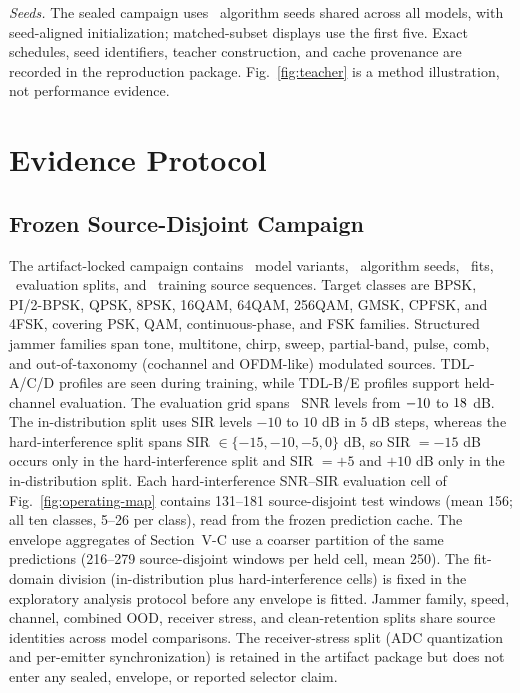 \documentclass[letterpaper,journal]{IEEEtran}
\begin{document}
\emph{Seeds.} The sealed campaign uses \ProtocolSeedCount\ algorithm seeds
shared across all models, with seed-aligned initialization; matched-subset
displays use the first five. Exact schedules, seed identifiers, teacher construction,
and cache provenance are recorded in the reproduction package.
Fig.~\ref{fig:teacher} is a method illustration, not performance evidence.

\section{Evidence Protocol}
\subsection{Frozen Source-Disjoint Campaign}
The artifact-locked campaign contains \ProtocolModelCount\ model variants,
\ProtocolSeedCount\ algorithm seeds, \ProtocolFitCount\ fits,
\ProtocolSplitCount\ evaluation splits, and \ProtocolTrainSources\ training
source sequences. Target classes are BPSK, PI/2-BPSK, QPSK, 8PSK, 16QAM, 64QAM, 256QAM, GMSK,
CPFSK, and 4FSK, covering PSK, QAM, continuous-phase, and FSK families.
Structured jammer families span tone, multitone, chirp, sweep, partial-band,
pulse, comb, and out-of-taxonomy (cochannel and OFDM-like) modulated sources. TDL-A/C/D
profiles are seen during training, while TDL-B/E profiles support held-channel
evaluation. The evaluation grid spans \SnrGridCount\ SNR levels from
$-10$ to $18$ dB. The in-distribution split uses SIR levels
$-10$ to $10$ dB in $5$ dB steps, whereas the hard-interference split spans
SIR $\in\{-15,-10,-5,0\}$ dB, so SIR $=-15$ dB occurs only in the
hard-interference split and SIR $=+5$ and $+10$ dB only in the in-distribution
split. Each hard-interference SNR--SIR evaluation cell of
Fig.~\ref{fig:operating-map} contains 131--181 source-disjoint test windows
(mean 156; all ten classes, 5--26 per class), read from the frozen prediction
cache. The envelope aggregates of Section~V-C use a coarser partition of the
same predictions (216--279 source-disjoint windows per held cell, mean 250). The fit-domain division
(in-distribution plus hard-interference cells) is fixed in the exploratory
analysis protocol before any envelope is fitted. Jammer family, speed, channel, combined OOD, receiver stress, and
clean-retention splits share source identities across model comparisons. The
receiver-stress split (ADC quantization and per-emitter synchronization) is
retained in the artifact package but does not enter any sealed, envelope, or
reported selector claim.
\end{document}
